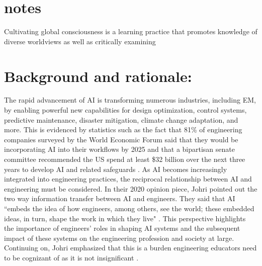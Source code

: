 \documentclass[11pt]{article}
\begin{document}
\pagestyle{plain}
\setlength{\baselineskip}{12.6pt} %
\setlength{\normalbaselineskip}{12.6pt} %

\section{notes}

Cultivating global consciousness is a learning practice that promotes knowledge of diverse worldviews as well as critically examining 

\section{Background and rationale:}

The rapid advancement of AI is transforming numerous industries, including EM, by enabling powerful new capabilities for design optimization, control systems, predictive maintenance, disaster mitigation, climate change adaptation, and more.
This is evidenced by statistics such as the fact that 81\% of engineering companies surveyed by the World Economic Forum said that they would be incorporating AI into their workflows by 2025 \cite{WEF2020} and that a bipartisan senate committee recommended the US spend at least \$32 billion over the next three years to develop AI and related safeguards \cite{seddiq2024schumers}.
As AI becomes increasingly integrated into engineering practices, the reciprocal relationship between AI and engineering must be considered.
In their 2020 opinion piece, Johri pointed out the two way information transfer between AI and engineers.  They said that AI ``embeds the idea of how engineers, among others, see the world; these embedded ideas, in turn, shape the work in which they live"  \cite{johri2020artificial}.
This perspective highlights the importance of engineers' roles in shaping AI systems and the subsequent impact of these systems on the engineering profession and society at large.
Continuing on, Johri emphasized that this is a burden engineering educators need to be cognizant of as it is not insignificant \cite{johri2020artificial}.
\end{document}
